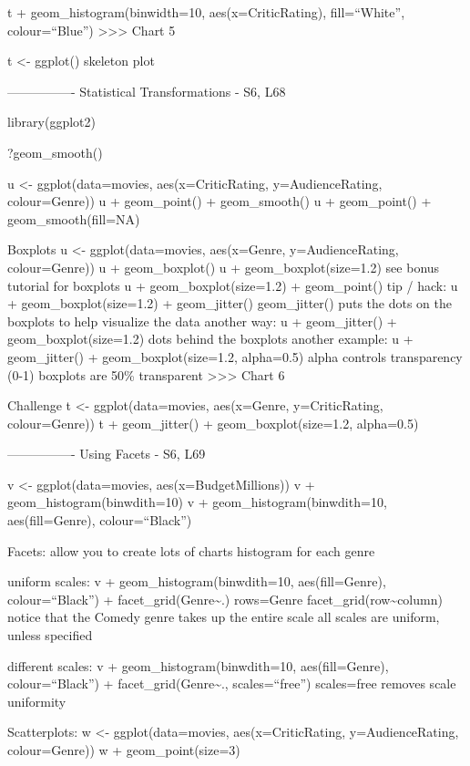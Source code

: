 \documentclass[]{article}
\begin{document}
t + geom\_histogram(binwidth=10, aes(x=CriticRating), fill=``White'',
colour=``Blue'') \textgreater{}\textgreater{}\textgreater{} Chart 5

t \textless{}- ggplot() skeleton plot

---------------- Statistical Transformations - S6, L68

library(ggplot2)

?geom\_smooth()

u \textless{}- ggplot(data=movies, aes(x=CriticRating, y=AudienceRating,
colour=Genre)) u + geom\_point() + geom\_smooth() u + geom\_point() +
geom\_smooth(fill=NA)

Boxplots u \textless{}- ggplot(data=movies, aes(x=Genre,
y=AudienceRating, colour=Genre)) u + geom\_boxplot() u +
geom\_boxplot(size=1.2) see bonus tutorial for boxplots u +
geom\_boxplot(size=1.2) + geom\_point() tip / hack: u +
geom\_boxplot(size=1.2) + geom\_jitter() geom\_jitter() puts the dots on
the boxplots to help visualize the data another way: u + geom\_jitter()
+ geom\_boxplot(size=1.2) dots behind the boxplots another example: u +
geom\_jitter() + geom\_boxplot(size=1.2, alpha=0.5) alpha controls
transparency (0-1) boxplots are 50\% transparent
\textgreater{}\textgreater{}\textgreater{} Chart 6

Challenge t \textless{}- ggplot(data=movies, aes(x=Genre,
y=CriticRating, colour=Genre)) t + geom\_jitter() +
geom\_boxplot(size=1.2, alpha=0.5)

---------------- Using Facets - S6, L69

v \textless{}- ggplot(data=movies, aes(x=BudgetMillions)) v +
geom\_histogram(binwdith=10) v + geom\_histogram(binwdith=10,
aes(fill=Genre), colour=``Black'')

Facets: allow you to create lots of charts histogram for each genre

uniform scales: v + geom\_histogram(binwdith=10, aes(fill=Genre),
colour=``Black'') + facet\_grid(Genre\textasciitilde{}.) rows=Genre
facet\_grid(row\textasciitilde{}column) notice that the Comedy genre
takes up the entire scale all scales are uniform, unless specified

different scales: v + geom\_histogram(binwdith=10, aes(fill=Genre),
colour=``Black'') + facet\_grid(Genre\textasciitilde{}.,
scales=``free'') scales=free removes scale uniformity

Scatterplots: w \textless{}- ggplot(data=movies, aes(x=CriticRating,
y=AudienceRating, colour=Genre)) w + geom\_point(size=3)
\end{document}
